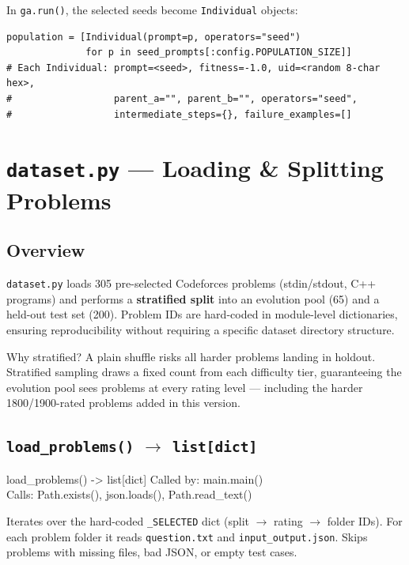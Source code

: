 \documentclass[11pt,a4paper]{report}
\newcommand{\fn}[1]{\texttt{#1}}
\newcommand{\pyf}[1]{\texttt{#1}}
\begin{document}
In \fn{ga.run()}, the selected seeds become \fn{Individual} objects:
\begin{lstlisting}[style=py]
population = [Individual(prompt=p, operators="seed")
              for p in seed_prompts[:config.POPULATION_SIZE]]
# Each Individual: prompt=<seed>, fitness=-1.0, uid=<random 8-char hex>,
#                  parent_a="", parent_b="", operators="seed",
#                  intermediate_steps={}, failure_examples=[]
\end{lstlisting}


\chapter{\pyf{dataset.py} --- Loading \& Splitting Problems}

\section{Overview}

\pyf{dataset.py} loads 305 pre-selected Codeforces problems (stdin/stdout, C++ programs)
and performs a \textbf{stratified split} into an evolution pool (65) and a held-out test
set (200).  Problem IDs are hard-coded in module-level dictionaries, ensuring
reproducibility without requiring a specific dataset directory structure.

\begin{concept}{Why stratified?}
A plain shuffle risks all harder problems landing in holdout.  Stratified sampling
draws a fixed count from each difficulty tier, guaranteeing the evolution pool sees
problems at every rating level --- including the harder 1800/1900-rated problems
added in this version.
\end{concept}

\section{\fn{load\_problems()} $\to$ \fn{list[dict]}}

\begin{spec}{load\_problems() -> list[dict]}
Called by: main.main() \\
Calls: Path.exists(), json.loads(), Path.read\_text()
\end{spec}

Iterates over the hard-coded \fn{\_SELECTED} dict (split $\to$ rating $\to$ folder IDs).
For each problem folder it reads \fn{question.txt} and \fn{input\_output.json}.
Skips problems with missing files, bad JSON, or empty test cases.
\end{document}
